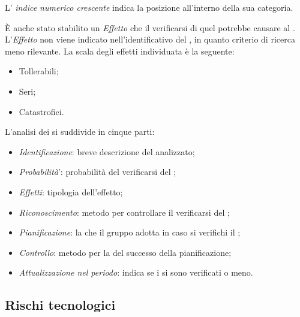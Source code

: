 L' \textit{indice numerico crescente} indica la posizione all'interno della sua categoria. 

\`E anche stato stabilito un \textit{Effetto} che il verificarsi di quel  potrebbe causare al . L'\textit{Effetto} non viene indicato nell'identificativo del , in quanto criterio di ricerca meno rilevante. La scala degli effetti individuata è la seguente:
\begin{itemize}
\item Tollerabili;
\item Seri;
\item Catastrofici.
\end{itemize}

L'analisi dei  si suddivide in cinque parti:
\begin{itemize}
\item \textit{Identificazione}: breve descrizione del  analizzato;
\item \textit{Probabilit\`a}': probabilit\`a del verificarsi del ;
\item \textit{Effetti}: tipologia dell'effetto;
\item \textit{Riconoscimento}: metodo per controllare il verificarsi del ;
\item \textit{Pianificazione}: la  che il gruppo adotta in caso si verifichi il ;
\item \textit{Controllo}: metodo per la  del successo della pianificazione;
\item \textit{Attualizzazione nel periodo}: indica se i  si sono verificati o meno.
\end{itemize}

\subsection{Rischi tecnologici}
